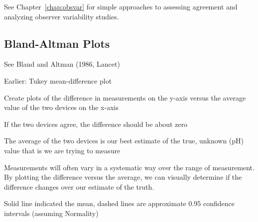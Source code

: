 See Chapter~\ref{chap:obsvar} for simple approaches to assessing agreement
and analyzing observer variability studies.

\subsection{Bland-Altman Plots} 

\bi 
  \item See Bland and Altman (1986, Lancet)
  \item Earlier: Tukey mean-difference plot
  \item Create plots of the difference in measurements on the y-axis
    versus the average value of the two devices on the x-axis 
  \item If the two devices agree, the difference should be about zero
  \item The average of the two devices is our best estimate of the
    true, unknown (pH) value that is we are trying to measure 
  \item Measurements will often vary in a systematic way over the
    range of measurement. By plotting the difference versus the
    average, we can visually determine if the difference changes over
    our estimate of the truth. 
  \item Solid line indicated the mean, dashed lines are approximate
    0.95 confidence intervals (assuming Normality) 
\ei
